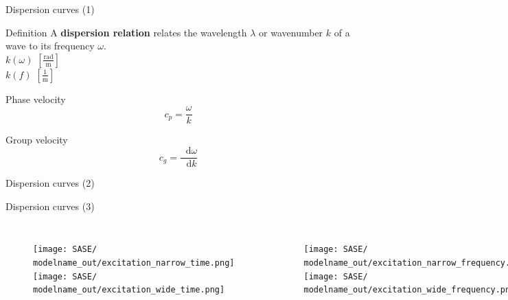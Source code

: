 \documentclass[10pt]{beamer} %
\DeclareRobustCommand*{\drv}{\mathop{}\!\mathrm{d}}
\begin{document}
\begin{frame}[label=frame4]{Dispersion curves (1)}
	\begin{alertblock}{Definition}
		A \textbf{dispersion relation} relates the wavelength $\lambda$ or wavenumber $k$ of a wave to its frequency $\omega$.\\
		 \vspace{10pt}
		$k(\omega)$ $[\frac{\mathrm{rad}}{\mathrm{m}}]$\\
			 \vspace{6pt}
		$k(f)$ $[\frac{1}{\mathrm{m}}]$
	\end{alertblock}
	\begin{block}{Phase velocity}
		\begin{equation*}
			c_p = \frac{\omega}{k}
		\end{equation*}
	\end{block}
\begin{block}{Group velocity}
	\begin{equation*}
	c_g = \frac{\drv \omega}{\drv k}
	\end{equation*}
\end{block}
\end{frame}
\begin{frame}[label=frame5]{Dispersion curves (2)}
\newcommand{\modelname}{SASE2}
	\begin{figure}
	\end{figure}
\end{frame}
\begin{frame}[label=frame6]{Dispersion curves (3)}
\def\myindenta{0.17\textwidth} %
\begin{columns}[T]
	\newcommand{\modelname}{dispersion_effect}
	\begin{figure}
		\texttt{[image: SASE/\\modelname\_out/excitation\_narrow\_time.png]}
		\texttt{[image: SASE/\\modelname\_out/excitation\_wide\_time.png]}
	\end{figure}
	\newcommand{\modelname}{dispersion_effect}
	\begin{figure}
			\texttt{[image: SASE/\\modelname\_out/excitation\_narrow\_frequency.png]}
			\texttt{[image: SASE/\\modelname\_out/excitation\_wide\_frequency.png]}
	\end{figure}
\end{columns}
\end{frame}
\end{document}
